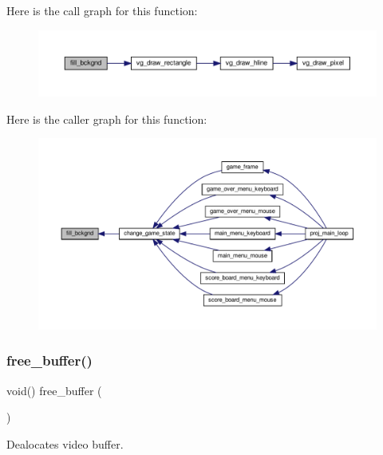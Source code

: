 Here is the call graph for this function\+:
\nopagebreak
\begin{figure}[H]
\begin{center}
\leavevmode
\includegraphics[width=350pt]{group__graphics_ga97ef658560a953fdb5a8ac8310b31516_cgraph}
\end{center}
\end{figure}
Here is the caller graph for this function\+:
\nopagebreak
\begin{figure}[H]
\begin{center}
\leavevmode
\includegraphics[width=350pt]{group__graphics_ga97ef658560a953fdb5a8ac8310b31516_icgraph}
\end{center}
\end{figure}
\mbox{\label{group__graphics_ga427099c53976d605666e7e2b39238bb9}} 
\subsubsection{\texorpdfstring{free\+\_\+buffer()}{free\_buffer()}}
{\footnotesize\ttfamily void() free\+\_\+buffer (\begin{DoxyParamCaption}{ }\end{DoxyParamCaption})}



Dealocates video buffer. 


